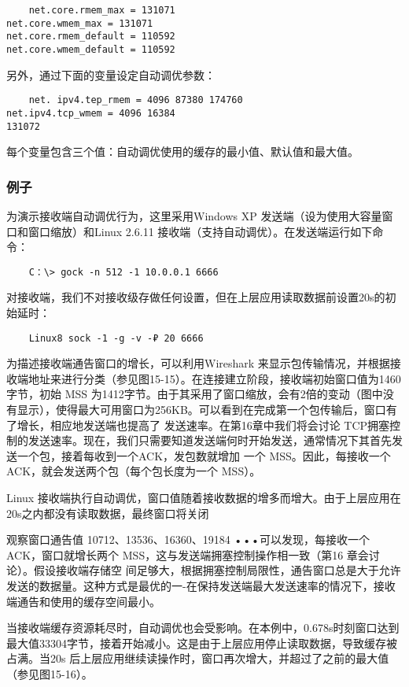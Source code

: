\begin{verbatim}
    net.core.rmem_max = 131071
net.core.wmem_max = 131071
net.core.rmem_default = 110592
net.core.wmem_default = 110592
\end{verbatim}

另外，通过下面的变量设定自动调优参数：
\begin{verbatim}
    net. ipv4.tep_rmem = 4096 87380 174760
net.ipv4.tcp_wmem = 4096 16384
131072
\end{verbatim}

每个变量包含三个值：自动调优使用的缓存的最小值、默认值和最大值。
\subsubsection{例子}
为演示接收端自动调优行为，这里采用Windows XP 发送端（设为使用大容量窗口和窗口缩放）和Linux 2.6.11 接收端（支持自动调优）。在发送端运行如下命令：
\begin{verbatim}
    C：\> gock -n 512 -1 10.0.0.1 6666
\end{verbatim}

对接收端，我们不对接收级存做任何设置，但在上层应用读取数据前设置20s的初始延时：
\begin{verbatim}
    Linux8 sock -1 -g -v -₽ 20 6666
\end{verbatim}

为描述接收端通告窗口的增长，可以利用Wireshark 来显示包传输情况，并根据接收端地址来进行分类（参见图15-15）。在连接建立阶段，接收端初始窗口值为1460字节，初始
MSS 为1412字节。由于其采用了窗口缩放，会有2倍的变动（图中没有显示），使得最大可用窗口为256KB。可以看到在完成第一个包传输后，窗口有了增长，相应地发送端也提高了
发送速率。在第16章中我们将会讨论 TCP拥塞控制的发送速率。现在，我们只需要知道发送端何时开始发送，通常情况下其首先发送一个包，接着每收到一个ACK，发包数就增加
一个 MSS。因此，每接收一个 ACK，就会发送两个包（每个包长度为一个 MSS）。

Linux 接收端执行自动调优，窗口值随着接收数据的增多而增大。由于上层应用在20s之内都没有读取数据，最终窗口将关闭

观察窗口通告值 10712、13536、16360、19184 •••可以发现，每接收一个ACK，窗口就增长两个 MSS，这与发送端拥塞控制操作相一致（第16 章会讨论）。假设接收端存储空
间足够大，根据拥塞控制局限性，通告窗口总是大于允许发送的数据量。这种方式是最优的一-在保持发送端最大发送速率的情况下，接收端通告和使用的缓存空间最小。

当接收端缓存资源耗尽时，自动调优也会受影响。在本例中，0.678s时刻窗口达到最大值33304字节，接着开始减小。这是由于上层应用停止读取数据，导致缓存被占满。当20s
后上层应用继续读操作时，窗口再次增大，并超过了之前的最大值（参见图15-16）。

